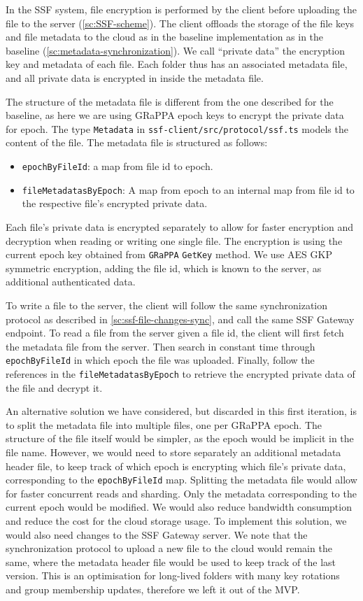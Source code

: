 In the SSF system, file encryption is performed by the client before
uploading the file to the server (\cref{sc:SSF-scheme}).
The client offloads the storage of the file keys and file metadata
to the cloud as in the baseline implementation as in the baseline (\cref{sc:metadata-synchronization}).
We call ``private data'' the encryption key and metadata of each file.
Each folder thus has an associated metadata file, and all private data
is encrypted in inside the metadata file.

The structure of the metadata file is different from the one
described for the baseline, as here we are using GRaPPA epoch
keys to encrypt the private data for epoch.
The type \texttt{Metadata} in \texttt{ssf-client/src/protocol/ssf.ts}
models the content of the file. 
The metadata file is structured as follows:
\begin{itemize}
    \item \texttt{epochByFileId}: a map from file id to epoch.
    \item \texttt{fileMetadatasByEpoch}: A map from epoch to an internal map from file id to the respective file's encrypted private data.
\end{itemize}

Each file's private data is encrypted separately to allow for
faster encryption and decryption when reading or writing 
one single file.
The encryption is using the current epoch key obtained from
\texttt{GRaPPA} \texttt{GetKey} method. We use AES GKP
symmetric encryption, adding the file id, which is known to
the server, as additional authenticated data.

To write a file to the server, the client will follow the same
synchronization protocol as described in \cref{sc:ssf-file-changes-sync}, 
and call the same SSF Gateway endpoint.
To read a file from the server given a file id, the client will
first fetch the metadata file from the server.
Then search in constant time through \texttt{epochByFileId} 
in which epoch the file was uploaded.
Finally, follow the references in the \texttt{fileMetadatasByEpoch}
to retrieve the encrypted private data of the file and decrypt it.

An alternative solution we have considered, but discarded in this
first iteration, is to split the metadata file into multiple files,
one per GRaPPA epoch.
The structure of the file itself would be simpler,
as the epoch would be implicit in the file name.
However, we would need to store separately an additional metadata header
file, to keep track of which epoch is encrypting which file's private data,
corresponding to the \texttt{epochByFileId} map.
Splitting the metadata file would allow for faster concurrent
reads and sharding. Only the metadata corresponding
to the current epoch would be modified.
We would also reduce bandwidth consumption and reduce the cost for the cloud storage usage.
To implement this solution, we would also need changes to the
SSF Gateway server. We note that the synchronization protocol to
upload a new file to the cloud would remain the same,
where the metadata header file would be used to keep track
of the last version.
This is an optimisation for long-lived folders with many 
key rotations and group membership updates,
therefore we left it out of the MVP.

